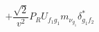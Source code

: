 %
\begin{dmath*}
%
  +  \frac{\sqrt{2}}{v^2}P_R U_{f_1 g_1} m_{\nu_{g_1}} \delta_{g_1 f_2}^*
%
\end{dmath*}
%
